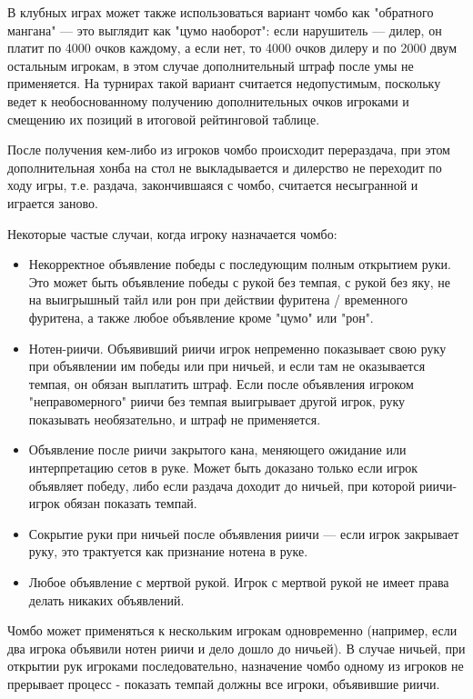 В клубных играх может также использоваться вариант чомбо как "обратного мангана" --- это выглядит как "цумо наоборот": если нарушитель --- дилер, он платит по 4000 очков каждому, а если нет, то 4000 очков дилеру и по 2000 двум остальным игрокам, в этом случае дополнительный штраф после умы не применяется. На турнирах такой вариант считается недопустимым, поскольку ведет к необоснованному получению дополнительных очков игроками и смещению их позиций в итоговой рейтинговой таблице. 

После получения кем-либо из игроков чомбо происходит перераздача, при этом дополнительная хонба на стол не выкладывается и дилерство не переходит по ходу игры, т.е. раздача, закончившаяся с чомбо, считается несыгранной и играется заново.

Некоторые частые случаи, когда игроку назначается чомбо:
\begin{itemize}
	\item Некорректное объявление победы с последующим полным открытием руки. Это может быть объявление победы с рукой без темпая, с рукой без яку, не на выигрышный тайл или рон при действии фуритена / временного фуритена, а также любое объявление кроме "цумо" или "рон".
	\item Нотен-риичи. Объявивший риичи игрок непременно показывает свою руку при объявлении им победы или при ничьей, и если там не оказывается темпая, он обязан выплатить штраф. Если после объявления игроком "неправомерного" риичи без темпая выигрывает другой игрок, руку показывать необязательно, и штраф не применяется.
	\item Объявление после риичи закрытого кана, меняющего ожидание или интерпретацию сетов в руке. Может быть доказано только если игрок объявляет победу, либо если раздача доходит до ничьей, при которой риичи-игрок обязан показать темпай.
	\item Сокрытие руки при ничьей после объявления риичи --- если игрок закрывает руку, это трактуется как признание нотена в руке.
	\item Любое объявление с мертвой рукой. Игрок с мертвой рукой не имеет права делать никаких объявлений.
\end{itemize}

Чомбо может применяться к нескольким игрокам одновременно (например, если два игрока объявили нотен риичи и дело дошло до ничьей). В случае ничьей, при открытии рук игроками последовательно, назначение чомбо одному из игроков не прерывает процесс - показать темпай должны все игроки, объявившие риичи.

